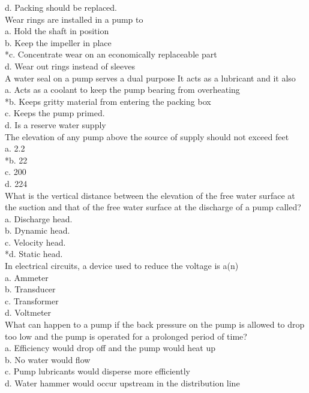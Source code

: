d. Packing should be replaced. \\
 Wear rings are installed in a pump to \\
a. Hold the shaft in position \\
b. Keep the impeller in place \\
*c. Concentrate wear on an economically replaceable part \\
d. Wear out rings instead of sleeves \\
 A water seal on a pump serves a dual purpose It acts as a lubricant and it also \\
a. Acts as a coolant to keep the pump bearing from overheating \\
*b. Keeps gritty material from entering the packing box \\
c. Keeps the pump primed. \\
d. Is a reserve water supply \\
 The elevation of any pump above the source of supply should not exceed  {\underline{\hspace{1cm}}} feet\\
a. 2.2 \\
*b. 22 \\
c. 200 \\
d. 224\\
 What is the vertical distance between the elevation of the free water surface at the suction and that of the free water surface at the discharge of a pump called?\\
a.	Discharge head.\\
b.	Dynamic head.\\
c.	Velocity head.\\
*d.	Static head.\\
In electrical circuits, a device used to reduce the voltage is a(n)\\
a. Ammeter\\
b. Transducer\\
c. Transformer\\
d. Voltmeter\\
What can happen to a pump if the back pressure on the pump is allowed to drop too low and the pump is operated for a prolonged period of time?\\
a. Efficiency would drop off and the pump would heat up\\
b. No water would flow\\
c. Pump lubricants would disperse more efficiently\\
d. Water hammer would occur upstream in the distribution line\\




